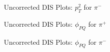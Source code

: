 \begin{frame}{Uncorrected DIS Plots: $p_T^2$ for $\pi^-$}
    \label{20.10f::pt2_pi-}

    \begin{figure}[t]
    \end{figure}

\end{frame}

\begin{frame}{Uncorrected DIS Plots: $\phi_{PQ}$ for $\pi^+$}
    \label{20.10g::phipq_pi+}

    \begin{figure}[t]
    \end{figure}

\end{frame}

\begin{frame}{Uncorrected DIS Plots: $\phi_{PQ}$ for $\pi^-$}
    \label{20.10h::phipq_pi-}

    \begin{figure}[t]
    \end{figure}

\end{frame}
